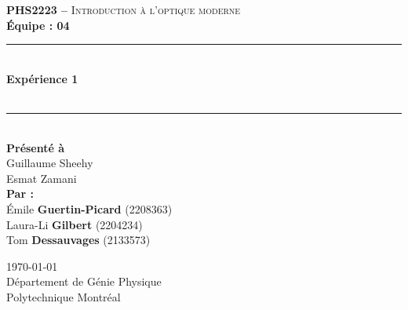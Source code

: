 \documentclass[11pt,letterpaper]{article}
\begin{document}
\begin{titlepage}
\center

\begin{figure}
\end{figure}
\vspace*{2 cm}

\textsc{\Large \textbf{PHS2223 --} Introduction à l'optique moderne}\\[0.5cm]
\large{\textbf{Équipe : 04}}\\[1.5cm]

\rule{\linewidth}{0.5mm} \\[0.5cm]
\Large{\textbf{Expérience 1}} \\[0.2cm]
\\
\rule{\linewidth}{0.2mm} \\[2.3cm]

\large{\textbf{Présenté à}\\
  Guillaume Sheehy\\
  Esmat Zamani\\[2.5cm]
  \textbf{Par :}\\
  Émile \textbf{Guertin-Picard} (2208363)\\
  Laura-Li \textbf{Gilbert} (2204234)\\
  Tom \textbf{Dessauvages} (2133573)\\[3cm]}

\large{\today\\
Département de Génie Physique\\
Polytechnique Montréal\\}

\end{titlepage}


\tableofcontents
{}
\newpage

\pagestyle{fancy}
\setlength{\headheight}{14pt}
\renewcommand{\headrulewidth}{0pt}
\fancyfoot[R]{\thepage}

\pagestyle{fancy}
\fancyhf{}
\renewcommand{\headrulewidth}{1pt}
\fancyhead[R]{\today}
\fancyfoot[R]{\thepage}

\setcounter{page}{1}

\end{document}
